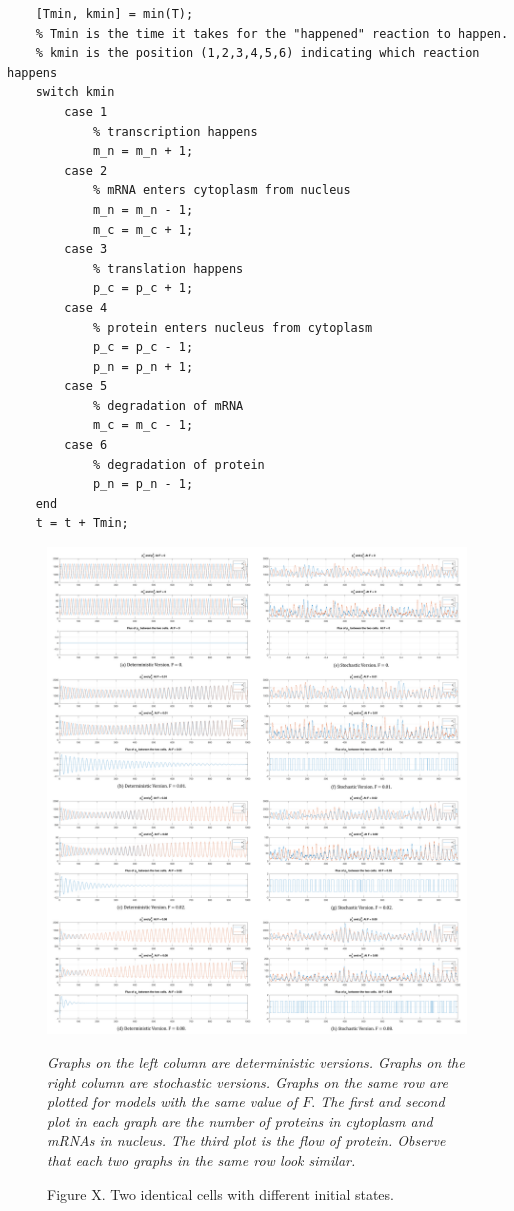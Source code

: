 \documentclass[12pt]{article}
\renewcommand{\(}{\left (}
\renewcommand{\)}{\right )}
\begin{document}
\begin{lstlisting}
    [Tmin, kmin] = min(T);
    % Tmin is the time it takes for the "happened" reaction to happen.
    % kmin is the position (1,2,3,4,5,6) indicating which reaction happens
    switch kmin
        case 1
            % transcription happens
            m_n = m_n + 1;
        case 2
            % mRNA enters cytoplasm from nucleus
            m_n = m_n - 1;
            m_c = m_c + 1;
        case 3
            % translation happens
            p_c = p_c + 1;
        case 4
            % protein enters nucleus from cytoplasm
            p_c = p_c - 1;
            p_n = p_n + 1;
        case 5
            % degradation of mRNA
            m_c = m_c - 1;
        case 6
            % degradation of protein
            p_n = p_n - 1;
    end
    t = t + Tmin;
\end{lstlisting}



\begin{figure}[!]
    \centering
	\begin{minipage}{0.99\textwidth}
		\centering
		\includegraphics[width=0.99\textwidth]{combined_results.png}
		\caption*{\small Figure X. Two identical cells with different initial states.}
	\end{minipage}
	\footnotesize
	\emph{Graphs on the left column are deterministic versions. Graphs on the right column are stochastic versions. Graphs on the same row are plotted for models with the same value of $F.$ The first and second plot in each graph are the number of proteins in cytoplasm and mRNAs in nucleus. The third plot is the flow of protein. Observe that each two graphs in the same row look similar.}
\end{figure}
\end{document}
